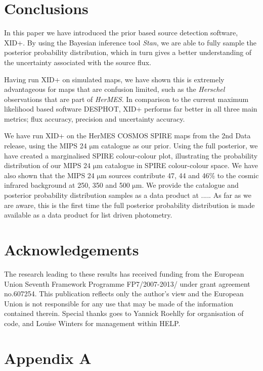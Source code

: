 \documentclass[useAMS,usenatbib]{mnras}
\begin{document}
\section{Conclusions}\label{sec:conc}
In this paper we have introduced the prior based source detection software, \textsc{XID+}. By using the Bayesian inference tool \emph{Stan}, we are able to fully sample the posterior probability distribution, which in turn gives a better understanding of the uncertainty associated with the source flux. 

Having run \textsc{XID+} on simulated maps, we have shown this is extremely advantageous for maps that are confusion limited, such as the \emph{Herschel} observations that are part of \emph{HerMES}. In comparison to the current maximum likelihood based software \textsc{DESPHOT}, XID+ performs far better in all three main metrics; flux accuracy, precision and uncertainty accuracy.

We have run \textsc{XID+} on the HerMES COSMOS SPIRE maps from the 2nd Data release, using the MIPS 24 $\mathrm{\mu m}$ catalogue \citep{LeFLoch:2009} as our prior. Using the full posterior, we have created a marginalised SPIRE colour-colour plot, illustrating the probability distribution of our MIPS 24 $\mathrm{\mu m}$ catalogue in SPIRE colour-colour space. We have also shown that the MIPS 24 $\mathrm{\mu m}$ sources contribute 47, 44 and 46\%  to the cosmic infrared background at 250, 350 and 500 $\mathrm{\mu m}$. We provide the catalogue and posterior probability distribution samples as a data product at ..... As far as we are aware, this is the first time the full posterior probability distribution is made available as a data product for list driven photometry.
 

\section*{Acknowledgements}%
The research leading to these results has received funding from the European Union Seventh Framework Programme FP7/2007-2013/ under grant agreement no.607254. This publication reflects only the author's view and the European Union is not responsible for any use that may be made of the information contained therein. Special thanks goes to Yannick Roehlly for organisation of code, and Louise Winters for management within HELP.
%
%

\appendix
\section*{Appendix A}\label{Stan_model}
\onecolumn

%
%
%
%
%
%
%
\end{document}
